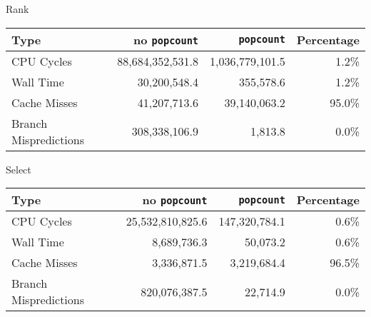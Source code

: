 Rank

\begin{tabular}{|l|r|r|r|}
\hline
Type						& no \texttt{popcount}	& \texttt{popcount}	& Percentage \\ \hline
CPU Cycles 				& 88,684,352,531.8	& 1,036,779,101.5	& 1.2\% \\ \hline
Wall Time				& 30,200,548.4		& 355,578.6			& 1.2\% \\ \hline
Cache Misses				& 41,207,713.6		& 39,140,063.2		& 95.0\% \\ \hline
Branch Mispredictions	& 308,338,106.9		& 1,813.8			& 0.0\% \\ \hline
\end{tabular}


Select

\begin{tabular}{|l|r|r|r|}
\hline
Type						& no \texttt{popcount}	& \texttt{popcount}	& Percentage \\ \hline
CPU Cycles 				& 25,532,810,825.6	& 147,320,784.1	& 0.6\% \\ \hline
Wall Time				& 8,689,736.3		& 50,073.2		& 0.6\% \\ \hline
Cache Misses				& 3,336,871.5		& 3,219,684.4	& 96.5\% \\ \hline
Branch Mispredictions	& 820,076,387.5		& 22,714.9		& 0.0\% \\ \hline
\end{tabular}